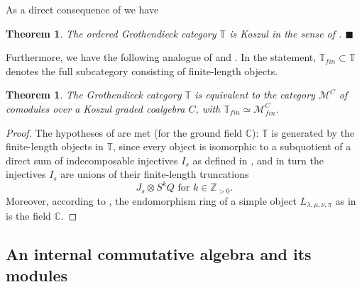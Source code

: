 \documentclass[11pt]{article}
\theoremstyle{plain}
\newtheorem{theorem}[lemma]{Theorem}
\theoremstyle{nonumberplain}
\theoremstyle{plain}
\numberwithin{equation}{section}
\theoremstyle{nonumberplain}
\newtheorem{proof}{Proof}
\newcommand\bC{{\mathbb C}}
\newcommand\bT{{\mathbb T}}
\newcommand\bZ{{\mathbb Z}}
\newcommand\cM{{\mathcal M}}
\newcommand\1{{\bf 1}}
\newcommand{\qedhere}{\mbox{}\hfill\ensuremath{\blacksquare}}
\begin{document}
As a direct consequence of  we have

\begin{theorem}\label{thm:4kosz}
  The ordered Grothendieck category ${\bT}$ is Koszul in the sense of .
  \qedhere
\end{theorem}

Furthermore, we have the following analogue of \cite[Corollary 3.19]{us0} and \cite[Corollary 4.25 (d)]{us1}. In the statement, $\bT_{fin}\subset \bT$ denotes the full subcategory consisting of finite-length objects.

\begin{theorem}\label{th:koszcoalg}
  The Grothendieck category ${\bT}$ is equivalent to the category $\cM^C$ of comodules over a Koszul graded coalgebra $C$, with $\bT_{fin}\simeq \cM^C_{fin}$.
\end{theorem}
\begin{proof}
  The hypotheses of  are met (for the ground field $\bC$): ${\bT}$ is generated by the finite-length objects in $\bT$, since every object is isomorphic to a subquotient of a direct sum of indecomposable injectives $I_s$ as defined in , and in turn the injectives $I_s$ are unions of their finite-length truncations
  \begin{equation*}
    J_s\otimes S^kQ\text{ for } k\in \bZ_{>0}. 
  \end{equation*}
  Moreover, according to , the endomorphism ring of a simple object $L_{\lambda,\mu,\nu,\pi}$ as in  is the field $\bC$.
\end{proof}

\subsection{An internal commutative algebra and its modules}\label{subse:intalg}
\end{document}
